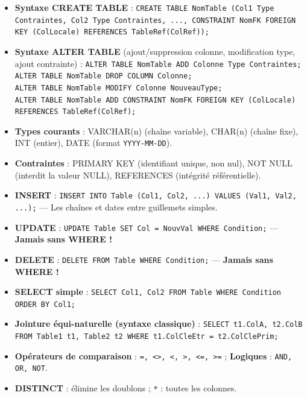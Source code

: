 \documentclass[11pt]{article}
\newcommand{\cle}[1]{{\popxbold\color{popdark}#1}}
\begin{document}
\begin{propriete}
\begin{itemize}
    \item \textbf{Syntaxe \cle{CREATE TABLE}} :
    \texttt{CREATE TABLE NomTable (Col1 Type Contraintes, Col2 Type Contraintes, ..., CONSTRAINT NomFK FOREIGN KEY (ColLocale) REFERENCES TableRef(ColRef));}
    \item \textbf{Syntaxe \cle{ALTER TABLE}} (ajout/suppression colonne, modification type, ajout contrainte) :
    \texttt{ALTER TABLE NomTable ADD Colonne Type Contraintes;} \\
    \texttt{ALTER TABLE NomTable DROP COLUMN Colonne;} \\
    \texttt{ALTER TABLE NomTable MODIFY Colonne NouveauType;} \\
    \texttt{ALTER TABLE NomTable ADD CONSTRAINT NomFK FOREIGN KEY (ColLocale) REFERENCES TableRef(ColRef);}
    \item \textbf{Types courants} : \cle{VARCHAR(n)} (chaîne variable), \cle{CHAR(n)} (chaîne fixe), \cle{INT} (entier), \cle{DATE} (format \texttt{YYYY-MM-DD}).
    \item \textbf{Contraintes} : \cle{PRIMARY KEY} (identifiant unique, non nul), \cle{NOT NULL} (interdit la valeur \cle{NULL}), \cle{REFERENCES} (intégrité référentielle).
    \item \textbf{\cle{INSERT}} : \texttt{INSERT INTO Table (Col1, Col2, ...) VALUES (Val1, Val2, ...);} — Les chaînes et dates entre guillemets simples.
    \item \textbf{\cle{UPDATE}} : \texttt{UPDATE Table SET Col = NouvVal WHERE Condition;} — \textbf{Jamais sans \cle{WHERE} !}
    \item \textbf{\cle{DELETE}} : \texttt{DELETE FROM Table WHERE Condition;} — \textbf{Jamais sans \cle{WHERE} !}
    \item \textbf{\cle{SELECT} simple} : \texttt{SELECT Col1, Col2 FROM Table WHERE Condition ORDER BY Col1;}
    \item \textbf{Jointure équi-naturelle (syntaxe classique)} : \texttt{SELECT t1.ColA, t2.ColB FROM Table1 t1, Table2 t2 WHERE t1.ColCleEtr = t2.ColClePrim;}
    \item \textbf{Opérateurs de comparaison} : \texttt{=, <>, <, >, <=, >=} ; \textbf{Logiques} : \texttt{AND, OR, NOT}.
    \item \textbf{\cle{DISTINCT}} : élimine les doublons ; \texttt{*} : toutes les colonnes.
\end{itemize}
\end{propriete}
\end{document}
